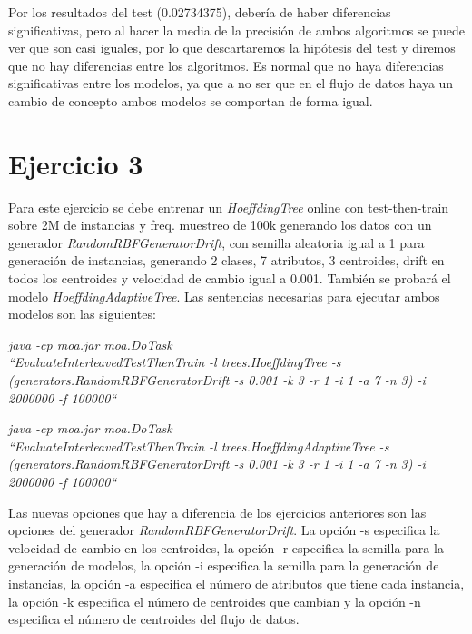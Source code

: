 Por los resultados del test (0.02734375), debería de haber diferencias significativas, pero al hacer la media de la precisión de ambos algoritmos se puede ver que son casi iguales, por lo que descartaremos la hipótesis del test y diremos que no hay diferencias entre los algoritmos. Es normal que no haya diferencias significativas entre los modelos, ya que a no ser que en el flujo de datos haya un cambio de concepto ambos modelos se comportan de forma igual.

\section{Ejercicio 3}
Para este ejercicio se debe entrenar un \textit{HoeffdingTree} online con test-then-train sobre 2M de instancias y freq. muestreo de 100k generando los datos con un generador \textit{RandomRBFGeneratorDrift}, con semilla aleatoria igual a 1 para generación de instancias, generando 2 clases, 7 atributos, 3 centroides, drift en todos los centroides y velocidad de cambio igual a 0.001. También se probará el modelo \textit{HoeffdingAdaptiveTree}. Las sentencias necesarias para ejecutar ambos modelos son las siguientes:
\vspace{0.06in}

\textit{java -cp moa.jar moa.DoTask \\``EvaluateInterleavedTestThenTrain -l trees.HoeffdingTree -s\\
(generators.RandomRBFGeneratorDrift -s 0.001 -k 3 -r 1 -i 1 -a 7 -n 3)
-i 2000000 -f 100000``
}

\textit{java -cp moa.jar moa.DoTask \\``EvaluateInterleavedTestThenTrain -l trees.HoeffdingAdaptiveTree -s\\
(generators.RandomRBFGeneratorDrift -s 0.001 -k 3 -r 1 -i 1 -a 7 -n 3)
-i 2000000 -f 100000``}

\vspace{0.06in}

Las nuevas opciones que hay a diferencia de los ejercicios anteriores son las opciones del generador \textit{RandomRBFGeneratorDrift}. La opción -s especifica la velocidad de cambio en los centroides, la opción -r especifica la semilla para la generación de modelos, la opción -i especifica la semilla para la generación de instancias, la opción -a especifica el número de atributos que tiene cada instancia, la opción -k especifica el número de centroides que cambian y la opción -n especifica el número de centroides del flujo de datos.
\newline

